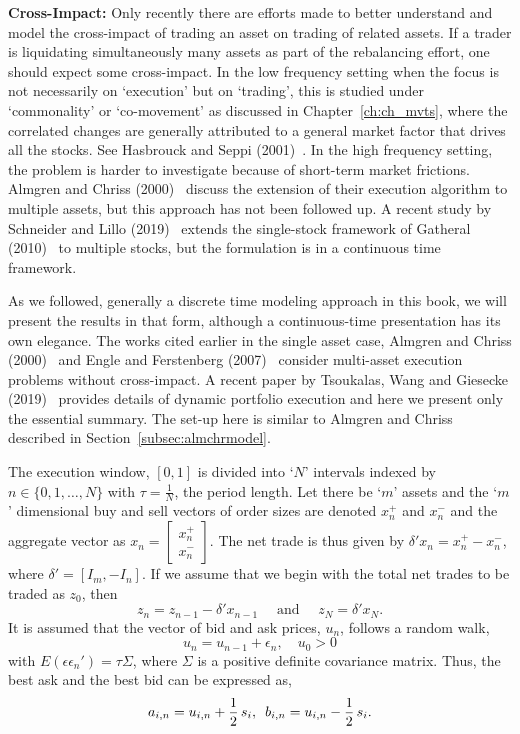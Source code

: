 \noindent\textbf{Cross-Impact:} Only recently there are efforts made to better understand and model the cross-impact of trading an asset on trading of related assets. If a trader is liquidating simultaneously many assets as part of the rebalancing effort, one should expect some cross-impact. In the low frequency setting when the focus is not necessarily on `execution' but on `trading', this is studied under `commonality' or `co-movement' as discussed in Chapter~\ref{ch:ch_mvts}, where the correlated changes are generally attributed to a general market factor that drives all the stocks. See Hasbrouck and Seppi (2001)~\cite{seppi2001}. In the high frequency setting, the problem is harder to investigate because of short-term market frictions. Almgren and Chriss (2000)~\cite{alm2000} discuss the extension of their execution algorithm to multiple assets, but this approach has not been followed up. A recent study by Schneider and Lillo (2019)~\cite{schnlillo19} extends the single-stock framework of Gatheral (2010)~\cite{gatheral} to multiple stocks, but the formulation is in a continuous time framework.


As we followed, generally a discrete time modeling approach in this book, we will present the results in that form, although a continuous-time presentation has its own elegance. The works cited earlier in the single asset case, Almgren and Chriss (2000)~\cite{alm2000} and Engle and Ferstenberg (2007)~\cite{engle2007} consider multi-asset execution problems without cross-impact. A recent paper by Tsoukalas, Wang and Giesecke (2019)~\cite{giesecke} provides details of dynamic portfolio execution and here we present only the essential summary. The set-up here is similar to Almgren and Chriss described in Section~\ref{subsec:almchrmodel}.


The execution window, $[0,1]$ is divided into `$N$' intervals indexed by $n \in \{0,1,\ldots,N\}$ with $\tau=\frac{1}{N}$, the period length. Let there be `$m$' assets and the `$m$' dimensional buy and sell vectors of order sizes are denoted $x_n^+$ and $x_n^-$ and the aggregate vector as $x_n= \begin{bmatrix} x_n^+ \\ x_n^- \end{bmatrix}$. The net trade is thus given by $\delta' x_n = x_n^+ - x_n^-$, where $\delta'= [I_m, -I_n]$. If we assume that we begin with the total net trades to be traded as $z_0$, then
	\begin{equation}
	z_n = z_{n-1} - \delta' x_{n-1} \quad \text{ and } \quad z_N= \delta' x_N.
	\end{equation}
It is assumed that the vector of bid and ask prices, $u_n$, follows a random walk,
	\begin{equation}
	u_n= u_{n-1} + \epsilon_n, \quad u_0 > 0
	\end{equation}
with $E(\epsilon \epsilon_n')= \tau \Sigma$, where $\Sigma$ is a positive definite covariance matrix. Thus, the best ask and the best bid can be expressed as,
	\begin{equation}
	a_{i,n} = u_{i,n} + \frac{1}{2} \, s_i, \enskip b_{i,n} = u_{i,n} - \frac{1}{2}\, s_i.
	\end{equation}


